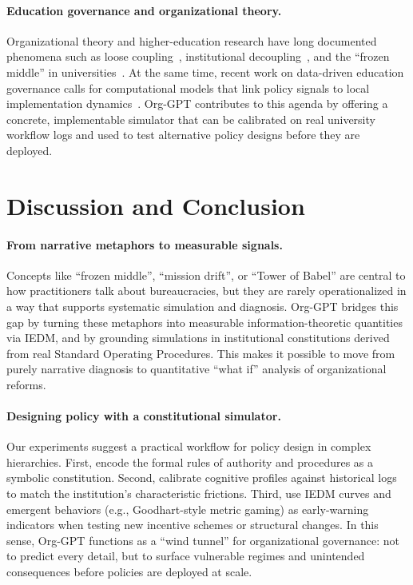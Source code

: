 \documentclass{article}
\begin{document}
\paragraph{Education governance and organizational theory.}
Organizational theory and higher-education research have long documented phenomena such as loose coupling~\citep{weick1976educational}, institutional decoupling~\citep{meyer1977institutionalized}, and the ``frozen middle'' in universities~\citep{clark1983higher}. At the same time, recent work on data-driven education governance calls for computational models that link policy signals to local implementation dynamics~\citep{zhang2023computational}. Org-GPT contributes to this agenda by offering a concrete, implementable simulator that can be calibrated on real university workflow logs and used to test alternative policy designs before they are deployed.

\section{Discussion and Conclusion}

\paragraph{From narrative metaphors to measurable signals.}
Concepts like ``frozen middle'', ``mission drift'', or ``Tower of Babel'' are central to how practitioners talk about bureaucracies, but they are rarely operationalized in a way that supports systematic simulation and diagnosis. Org-GPT bridges this gap by turning these metaphors into measurable information-theoretic quantities via IEDM, and by grounding simulations in institutional constitutions derived from real Standard Operating Procedures. This makes it possible to move from purely narrative diagnosis to quantitative ``what if'' analysis of organizational reforms.

\paragraph{Designing policy with a constitutional simulator.}
Our experiments suggest a practical workflow for policy design in complex hierarchies. First, encode the formal rules of authority and procedures as a symbolic constitution. Second, calibrate cognitive profiles against historical logs to match the institution's characteristic frictions. Third, use IEDM curves and emergent behaviors (e.g., Goodhart-style metric gaming) as early-warning indicators when testing new incentive schemes or structural changes. In this sense, Org-GPT functions as a ``wind tunnel'' for organizational governance: not to predict every detail, but to surface vulnerable regimes and unintended consequences before policies are deployed at scale.
\end{document}
